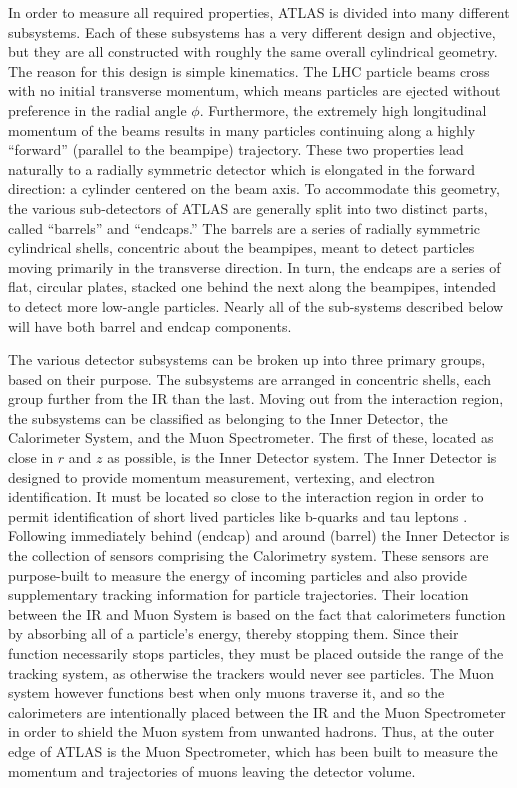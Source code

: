    In order to measure all required properties, ATLAS is divided into many different subsystems.
    Each of these subsystems has a very different design and objective, but they are all constructed with roughly the same overall cylindrical geometry.
    The reason for this design is simple kinematics.
    The LHC particle beams cross with no initial transverse momentum, which means particles are ejected without preference in the radial angle $\phi$.
    Furthermore, the extremely high longitudinal momentum of the beams results in many particles continuing along a highly ``forward'' (parallel to the beampipe) trajectory.
    These two properties lead naturally to a radially symmetric detector which is elongated in the forward direction: a cylinder centered on the beam axis.
    To accommodate this geometry, the various sub-detectors of ATLAS are generally split into two distinct parts, called ``barrels'' and ``endcaps.''
    The barrels are a series of radially symmetric cylindrical shells, concentric about the beampipes, meant to detect particles moving primarily in the transverse direction.
    In turn, the endcaps are a series of flat, circular plates, stacked one behind the next along the beampipes,
        intended to detect more low-angle particles.
    Nearly all of the sub-systems described below will have both barrel and endcap components.

    The various detector subsystems can be broken up into three primary groups, based on their purpose.
    The subsystems are arranged in concentric shells, each group further from the IR than the last.
    Moving out from the interaction region, the subsystems can be classified as belonging to the Inner Detector, the Calorimeter System, and the Muon Spectrometer.
    The first of these, located as close in $r$ and $z$ as possible, is the Inner Detector system.
    The Inner Detector is designed to provide momentum measurement, vertexing, and electron identification.
    It must be located so close to the interaction region in order to permit identification
        of short lived particles like b-quarks and tau leptons \cite{id_tdr}.
    Following immediately behind (endcap) and around (barrel) the Inner Detector is the collection of sensors comprising the Calorimetry system.
    These sensors are purpose-built to measure the energy of incoming particles and also provide supplementary tracking information for particle trajectories.
    Their location between the IR and Muon System is based on the fact that calorimeters function by absorbing all of a particle's energy, thereby stopping them.
    Since their function necessarily stops particles, they must be placed outside the range of the tracking system, as otherwise the trackers would never see particles.
    The Muon system however functions best when only muons traverse it, and so the calorimeters are intentionally placed between the IR and the Muon Spectrometer in order to shield the Muon system from unwanted hadrons.
    Thus, at the outer edge of ATLAS is the Muon Spectrometer,
        which has been built to measure the momentum and trajectories of muons leaving the detector volume.

